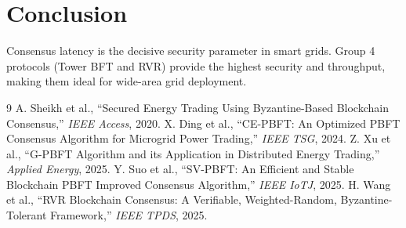 \documentclass[10pt,twocolumn,letterpaper]{article}
\begin{document}
\section{Conclusion}
Consensus latency is the decisive security parameter in smart grids. Group 4 protocols (Tower BFT and RVR) provide the highest security and throughput, making them ideal for wide-area grid deployment.

\begin{thebibliography}{9}
 A. Sheikh et al., ``Secured Energy Trading Using Byzantine-Based Blockchain Consensus,'' \emph{IEEE Access}, 2020.
 X. Ding et al., ``CE-PBFT: An Optimized PBFT Consensus Algorithm for Microgrid Power Trading,'' \emph{IEEE TSG}, 2024.
 Z. Xu et al., ``G-PBFT Algorithm and its Application in Distributed Energy Trading,'' \emph{Applied Energy}, 2025.
 Y. Suo et al., ``SV-PBFT: An Efficient and Stable Blockchain PBFT Improved Consensus Algorithm,'' \emph{IEEE IoTJ}, 2025.
 H. Wang et al., ``RVR Blockchain Consensus: A Verifiable, Weighted-Random, Byzantine-Tolerant Framework,'' \emph{IEEE TPDS}, 2025.
\end{thebibliography}
\end{document}
